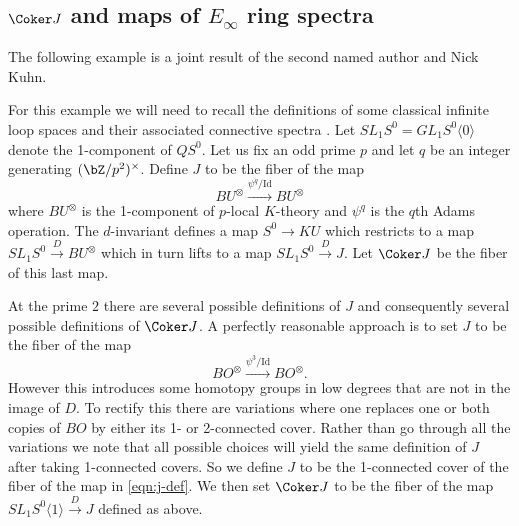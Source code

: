 \documentclass[leqno,oneside,english]{elsarticle}
\begin{document}
\subsection{\texorpdfstring{$\Coker J$}{Coker J} and maps of \texorpdfstring{$E_{\infty}$}{E\_â} ring spectra}\label{sec:coker-j}
The following example is a joint result of the second named author and
Nick Kuhn.

For this example we will need to recall the definitions of some
classical infinite loop spaces and their associated connective spectra
\cite[p.271]{HoS78}. Let $SL_1 S^0=GL_1 S^0\langle 0\rangle$
denote the 1-component of $QS^0$. Let us fix an odd prime $p$ and let $q$ be an
integer generating $(\bZ/p^2)^{\times}$. 
{{\ifshowsaveblocks
{}
\fi}}{}Define $J$ to be the fiber of the map \[ BU^{\otimes}
\xrightarrow{\psi^q/\mathrm{Id}} BU^{\otimes} \] where $BU^{\otimes}$ is the
1-component of $p$-local $K$-theory and $\psi^q$ is the $q$th Adams
operation. The $d$-invariant defines a map $S^0\rightarrow KU$ which
restricts to a map $SL_1 S^0\xrightarrow{D} BU^{\otimes}$ which in turn
lifts to a map $SL_1 S^0\xrightarrow{D} J$. 
{{\ifshowsaveblocks
{}
\fi}}{}Let $\Coker J$ be the fiber of this last map.
{{\ifshowsaveblocks
{}
\fi}}{}

At the prime $2$ there are several possible definitions of $J$ and
consequently several possible definitions of $\Coker J$. A perfectly
reasonable approach is to set $J$ to be the fiber of the map
\begin{equation} \label{eqn:j-def}
BO^{\otimes} \xrightarrow{\psi^3/\mathrm{Id}} BO^{\otimes}.
\end{equation} 
However this introduces some homotopy groups in low degrees that are not
in the image of $D$. To rectify this there are variations where one
replaces one or both copies of $BO$ by either its 1- or 2-connected
cover. Rather than go through all the variations we note that all
possible choices will yield the same definition of $J$ after taking
1-connected covers. So we define $J$ to be the 1-connected cover of the
fiber of the map in \eqref{eqn:j-def}.  We then set $\Coker J$ to be the
fiber of the map $SL_1 S^0\langle 1\rangle \xrightarrow{D} J$ defined as above.
\end{document}
